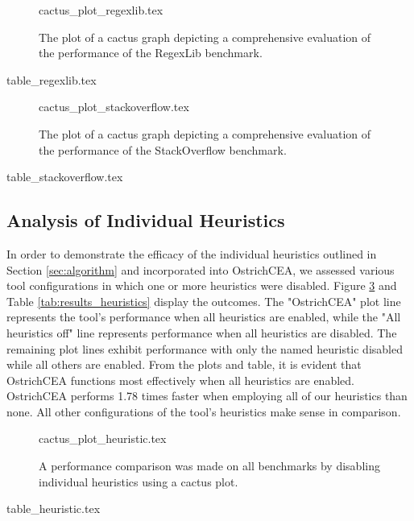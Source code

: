 \documentclass{standalone}
\begin{document}
\begin{figure}
  {cactus_plot_regexlib.tex}
  \caption{The plot of a cactus graph depicting a comprehensive evaluation of the performance of the RegexLib benchmark.}
  \label{fig:cactus_regexlib}
\end{figure}
\begin{table}
  {table_regexlib.tex}
  \caption{Detailed results for the RegexLib benchmark.}
  \label{tab:results_regexlib}
\end{table}

\begin{figure}
  {cactus_plot_stackoverflow.tex}
  \caption{The plot of a cactus graph depicting a comprehensive evaluation of the performance of the StackOverflow benchmark.}
  \label{fig:cactus_stackoverflow}
\end{figure}
\begin{table}
  {table_stackoverflow.tex}
  \caption{Detailed results for the StackOverflow benchmark.}
  \label{tab:results_stackoverflow}
\end{table}
\subsection{Analysis of Individual Heuristics}
In order to demonstrate the efficacy of the individual heuristics outlined in Section \ref{sec:algorithm} and incorporated into OstrichCEA, we assessed various tool configurations in which one or more heuristics were disabled. Figure \ref{fig:cactus_heuristics} and Table \ref{tab:results_heuristics} display the outcomes. The "OstrichCEA" plot line represents the tool's performance when all heuristics are enabled, while the "All heuristics off" line represents performance when all heuristics are disabled. The remaining plot lines exhibit performance with only the named heuristic disabled while all others are enabled. From the plots and table, it is evident that OstrichCEA functions most effectively when all heuristics are enabled. OstrichCEA performs 1.78 times faster when employing all of our heuristics than none. All other configurations of the tool's heuristics make sense in comparison.
\begin{figure}
  {cactus_plot_heuristic.tex}
  \caption{A performance comparison was made on all benchmarks by disabling individual heuristics using a cactus plot.}
  \label{fig:cactus_heuristics}
\end{figure}
\begin{table}
  {table_heuristic.tex}
  \caption{A performance comparison was made on all benchmarks by disabling individual heuristics.}
  \label{tab:results_heuristics}
\end{table}
\end{document}

